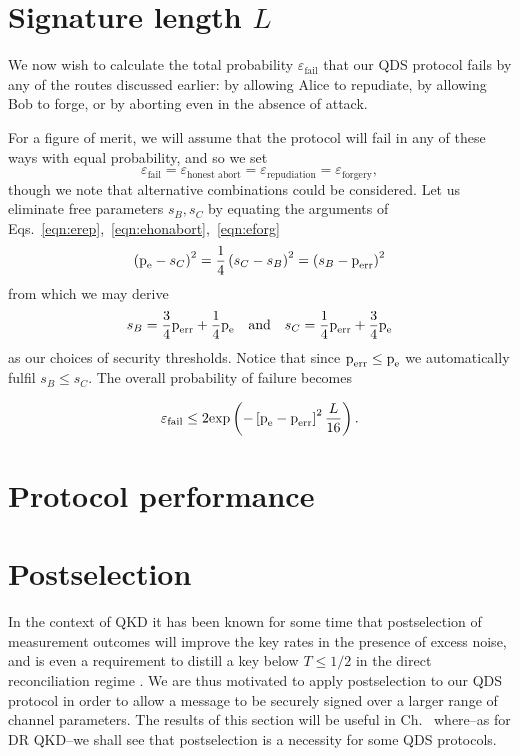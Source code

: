 \section{Signature length $L$}
We now wish to calculate the total probability $\varepsilon_{\text{fail}}$ that our QDS protocol fails by any of the routes discussed earlier: by allowing Alice to repudiate, by allowing Bob to forge, or by aborting even in the absence of attack.

For a figure of merit, we will assume that the protocol will fail in any of these ways with equal probability, and so we set
\begin{equation}
\varepsilon_{\text{fail}} = \varepsilon_{\text{honest abort}} = \varepsilon_{\text{repudiation}} = \varepsilon_{\text{forgery}},
\end{equation}
though we note that alternative combinations could be considered. Let us eliminate free parameters $s_B, s_C$ by equating the arguments of Eqs.~\ref{eqn:erep},~\ref{eqn:ehonabort},~\ref{eqn:eforg}
\begin{equation}
\left(\text{p}_{\text{e}} - s_C\right)^2  = \frac{1}{4}\left(s_C - s_B\right)^2 = \left(s_B - \text{p}_{\text{err}}\right)^2
\end{equation}
from which we may derive
\begin{equation}
s_B = \frac{3}{4} \perr + \frac{1}{4}\pe \qq{and} s_C = \frac{1}{4}\perr + \frac{3}{4}\pe
\end{equation}
as our choices of security thresholds. Notice that since $\text{p}_{\text{err}} \le \text{p}_{\text{e}}$ we automatically fulfil $s_B \le s_C$. The overall probability of failure becomes

\begin{equation}\label{eqn:efail}
\varepsilon_{\text{fail}} \le 2 \text{exp}\left( - \left[\text{p}_{\text{e}} - \text{p}_{\text{err}}\right]^2 \frac{L}{16}\right).
\end{equation}

\section{Protocol performance}


\section{Postselection}
In the context of QKD it has been known for some time that postselection of measurement outcomes will improve the key rates in the presence of excess noise, and is even a requirement to distill a key below $T \le 1/2$ in the direct reconciliation regime . We are thus motivated to apply postselection to our QDS protocol in order to allow a message to be securely signed over a larger range of channel parameters. The results of this section will be useful in Ch.~ where--as for DR QKD--we shall see that postselection is a necessity for some QDS protocols.


